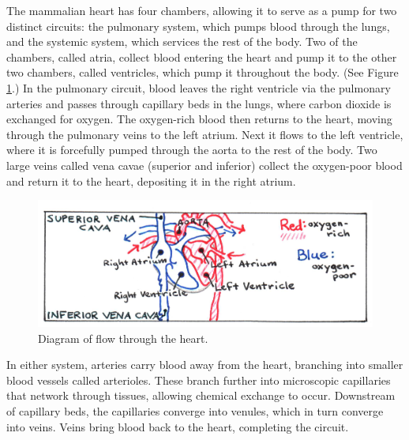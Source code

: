 The mammalian heart has four chambers, allowing it to serve as a pump for two distinct circuits: the pulmonary system, which pumps blood through the lungs, and the systemic system, which services the rest of the body.  Two of the chambers, called atria, collect blood entering the heart and pump it to the other two chambers, called ventricles, which pump it throughout the body.  (See Figure \ref{Fig2-3}.)  In the pulmonary circuit, blood leaves the right ventricle via the pulmonary arteries and passes through capillary beds in the lungs, where carbon dioxide is exchanged for oxygen.  The oxygen-rich blood then returns to the heart, moving through the pulmonary veins to the left atrium.  Next it flows to the left ventricle, where it is forcefully pumped through the aorta to the rest of the body.  Two large veins called vena cavae (superior and inferior) collect the oxygen-poor blood and return it to the heart, depositing it in the right atrium.  
\begin{figure}[htb]
	\centering
	\includegraphics[width=\textwidth]{./figures/Topic2/Fig2-3.jpg}
	\caption{Diagram of flow through the heart.}
	\label{Fig2-3}
\end{figure}  

In either system, arteries carry blood away from the heart, branching into smaller blood vessels called arterioles.  These branch further into microscopic capillaries that network through tissues, allowing chemical exchange to occur.  Downstream of capillary beds, the capillaries converge into venules, which in turn converge into veins.  Veins bring blood back to the heart, completing the circuit.

